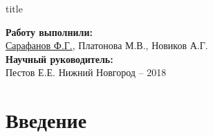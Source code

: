 
\newcommand{\sq}[1]{\tikz{\draw[draw=#1,fill=#1] (0,0) rectangle (0.7em,0.7em);}}
\usepackage{xcolor}

  
% 
\begin{frame}[plain]
	\centering
	\vspace{1.2cm}
	\begin{beamercolorbox}[sep=8pt,center]{title}
		\bf{}\inserttitle
	\end{beamercolorbox}
	\vspace{0.5cm}
	\normalsize \textbf{Работу выполнили:}\\
	\large
	\underline{Сарафанов Ф.Г.}, %
	{Платонова М.В.}, %
	{Новиков А.Г.}
	\\ 
	\vspace{0.5cm}
	\normalsize{\textbf{Научный руководитель:}\\}
	\large{Пестов Е.Е.}
	\vfill
	\small{Нижний Новгород -- 2018}
\end{frame}

\section{Введение}
